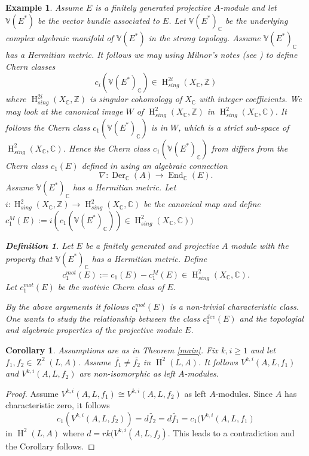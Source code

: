 \documentclass{amsart}
\theoremstyle{plain}
\newtheorem{corollary}[theorem]{Corollary}
\newtheorem{example}[theorem]{Example}
\theoremstyle{definition}
\newtheorem{definition}[theorem]{Definition}
\theoremstyle{remark}
\numberwithin{equation}{theorem}
\begin{document}
\begin{example}
Assume $E$ is a finitely generated projective $A$-module and let $\mathbb{V}(E^*)$ be the vector bundle associated to
$E$. Let $\mathbb{V}(E^*)_{\mathbb{C} }$ be the underlying complex algebraic manifold of $\mathbb{V}(E^*)$ in the strong topology.
Assume $\mathbb{V}(E^*)_{\mathbb{C} }$ has a Hermitian metric. It follows we may using Milnor's notes (see \cite{milnor}) to define
Chern classes 
\[  c_i(\mathbb{V}(E^*)_{\mathbb{C} })\in {\operatorname{H} }^{2i}_{sing}(X_{\mathbb{C} },\mathbb{Z}) \]
where ${\operatorname{H} }^{2i}_{sing}(X_{\mathbb{C} },\mathbb{Z})$ is singular cohomology of $X_{\mathbb{C} }$ with integer coefficients. We may look 
at the canonical image $W$ of ${\operatorname{H} }^{2}_{sing}(X_{\mathbb{C} },\mathbb{Z})$ in ${\operatorname{H} }^2_{sing}(X_{\mathbb{C} },{\mathbb{C} })$. It follows
the Chern class $c_1(\mathbb{V}(E^*)_{\mathbb{C} })$ is in $W$, which is a strict sub-space of ${\operatorname{H} }^2_{sing}(X_{\mathbb{C} },{\mathbb{C} })$.
Hence the Chern class $c_1(\mathbb{V}(E^*)_{\mathbb{C} })$ from \cite{milnor} 
differs from the Chern class $c_1(E)$ defined in \cite{maa1} using an algebraic connection
\[ \nabla: {\operatorname{Der} }_{\mathbb{C} }(A)\rightarrow {\operatorname{End} }_{\mathbb{C} }(E).\]
Assume $\mathbb{V}(E^*)_{\mathbb{C} }$ has a Hermitian metric.
Let $i:{\operatorname{H} }^2_{sing}(X_{\mathbb{C} },\mathbb{Z})\rightarrow {\operatorname{H} }^2_{sing}(X_{\mathbb{C} },{\mathbb{C} })$ be the canonical map and
define $c_1^M(E):=i(c_1(\mathbb{V}(E^*)_{\mathbb{C} }))\in {\operatorname{H} }^2_{sing}(X_{\mathbb{C} },{\mathbb{C} }))$

\begin{definition}Let $E$ be a finitely generated and projective $A$ module with the property that
$\mathbb{V}(E^*)_{\mathbb{C} }$ has a Hermitian metric. Define
\[ c_1^{mot}(E):=c_1(E)-c_1^M(E)\in {\operatorname{H} }_{sing}^2(X_{\mathbb{C} },{\mathbb{C} }).\]
Let $c_1^{mot}(E)$ be the \emph{motivic Chern class} of $E$.
\end{definition}

By the above arguments it follows $c_1^{mot}(E)$ is a non-trivial characteristic class.
One wants to study the relationship between the class $c_1^{dev}(E)$ and the topologial and algebraic properties
of the projective module $E$.
\end{example}

\begin{corollary} \label{isomod} Assumptions are as in Theorem \ref{main}. 
Fix $k,i\geq 1$ and let $f_1,f_2\in {\operatorname{Z}}^2(L,{A})$.  
Assume $\overline{f_1}\neq \overline{f_2}$ in  ${\operatorname{H} }^2(L,{A})$. It follows $V^{k,i}({A},L,f_1)$ and 
$V^{k,i}({A},L,f_2)$ are non-isomorphic as left ${A}$-modules.
\end{corollary} 
\begin{proof} Assume $V^{k,i}({A},L,f_1)\cong V^{k,i}({A},L,f_2)$ as left ${A}$-modules.
Since $A$ has characteristic zero, it follows
\[ c_1(V^{k,i}({A},L,f_2))=d\tilde{f_2}=d\tilde{f_1}=c_1(V^{k,i}({A},L,f_1)\]
in ${\operatorname{H} }^2(L,{A})$ where $d=rk(V^{k,i}({A},L,f_j)$. This leads to a contradiction and the Corollary follows.
\end{proof}
\end{document}
